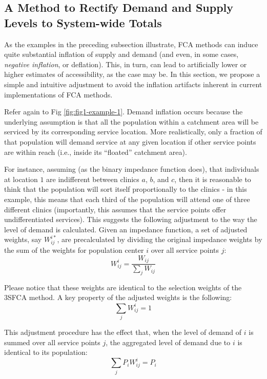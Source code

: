 \documentclass[10pt,letterpaper]{article}
\begin{document}
\subsection{A Method to Rectify Demand and Supply Levels to System-wide
Totals}\label{a-method-to-rectify-demand-and-supply-levels-to-system-wide-totals}

As the examples in the preceding subsection illustrate, FCA methods can
induce quite substantial inflation of supply and demand (and even, in
some cases, \emph{negative inflation}, or deflation). This, in turn, can
lead to artificially lower or higher estimates of accessibility, as the
case may be. In this section, we propose a simple and intuitive
adjustment to avoid the inflation artifacts inherent in current
implementations of FCA methods.

Refer again to Fig \ref{fig:fig1-example-1}. Demand inflation occurs
because the underlying assumption is that all the population within a
catchment area will be serviced by its corresponding service location.
More realistically, only a fraction of that population will demand
service at any given location if other service points are within reach
(i.e., inside its ``floated'' catchment area).

For instance, assuming (as the binary impedance function does), that
individuals at location \(1\) are indifferent between clinics \(a\),
\(b\), and \(c\), then it is reasonable to think that the population
will sort itself proportionally to the clinics - in this example, this
means that each third of the population will attend one of three
different clinics (importantly, this assumes that the service points
offer undifferentiated services). This suggests the following adjustment
to the way the level of demand is calculated. Given an impedance
function, a set of adjusted weights, say \(W^{i*}_{ij}\), are
precalculated by dividing the original impedance weights by the sum of
the weights for population center \(i\) over all service points \(j\):
\[
W_{ij}^{i} = \frac{W_{ij}}{\sum_j W_{ij}}
\]

Please notice that these weights are identical to the selection weights
of the 3SFCA method. A key property of the adjusted weights is the
following: \[
\sum_jW_{ij}^{i}=1
\]

This adjustment procedure has the effect that, when the level of demand
of \(i\) is summed over all service points \(j\), the aggregated level
of demand due to \(i\) is identical to its population: \[
\sum_j P_iW_{ij}^{i} = P_i
\]
\end{document}
